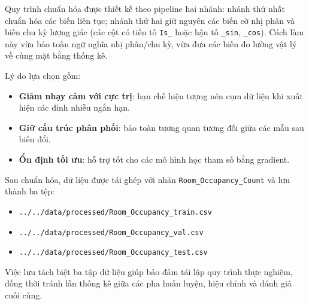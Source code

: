 Quy trình chuẩn hóa được thiết kế theo pipeline hai nhánh: nhánh thứ nhất chuẩn hóa các biến liên tục; nhánh thứ hai giữ nguyên các biến cờ nhị phân và biến chu kỳ lượng giác (các cột có tiền tố \texttt{Is\_} hoặc hậu tố \texttt{\_sin}, \texttt{\_cos}). Cách làm này vừa bảo toàn ngữ nghĩa nhị phân/chu kỳ, vừa đưa các biến đo lường vật lý về cùng mặt bằng thống kê.

Lý do lựa chọn gồm:
\begin{itemize}
    \item \textbf{Giảm nhạy cảm với cực trị}: hạn chế hiện tượng nén cụm dữ liệu khi xuất hiện các đỉnh nhiễu ngắn hạn.
    \item \textbf{Giữ cấu trúc phân phối}: bảo toàn tương quan tương đối giữa các mẫu sau biến đổi.
    \item \textbf{Ổn định tối ưu}: hỗ trợ tốt cho các mô hình học tham số bằng gradient.
\end{itemize}

Sau chuẩn hóa, dữ liệu được tái ghép với nhãn \texttt{Room\_Occupancy\_Count} và lưu thành ba tệp:
\begin{itemize}
    \item \texttt{../../data/processed/Room\_Occupancy\_train.csv}
    \item \texttt{../../data/processed/Room\_Occupancy\_val.csv}
    \item \texttt{../../data/processed/Room\_Occupancy\_test.csv}
\end{itemize}

Việc lưu tách biệt ba tập dữ liệu giúp bảo đảm tái lập quy trình thực nghiệm, đồng thời tránh lẫn thống kê giữa các pha huấn luyện, hiệu chỉnh và đánh giá cuối cùng.

